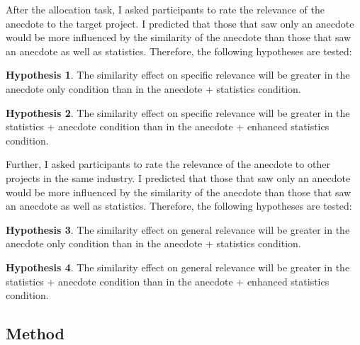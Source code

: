 \documentclass[a4paper, nobind, dvipsnames]{templates/ociamthesis}
\theoremstyle{definition}
\theoremstyle{definition}
\theoremstyle{definition}
\theoremstyle{definition}
\newtheorem{hypothesis}{Hypothesis}[chapter]
\theoremstyle{remark}
\begin{document}
After the allocation task, I asked participants to rate the relevance of the
anecdote to the target project. I predicted that those that saw only an
anecdote would be more influenced by the similarity of the anecdote than those
that saw an anecdote as well as statistics. Therefore, the following hypotheses
are tested:

\begin{hypothesis}
\protect\hypertarget{hyp:relevance-specific-anecdotes-1}{}{\label{hyp:relevance-specific-anecdotes-1} }The similarity effect on specific relevance will be greater in the anecdote only
condition than in the anecdote + statistics condition.
\end{hypothesis}

\begin{hypothesis}
\protect\hypertarget{hyp:relevance-specific-enhanced-anecdotes-1}{}{\label{hyp:relevance-specific-enhanced-anecdotes-1} }The similarity effect on specific relevance will be greater in the statistics +
anecdote condition than in the anecdote + enhanced statistics condition.
\end{hypothesis}

Further, I asked participants to rate the relevance of the anecdote to other
projects in the same industry. I predicted that those that saw only an anecdote
would be more influenced by the similarity of the anecdote than those that saw
an anecdote as well as statistics. Therefore, the following hypotheses are
tested:

\begin{hypothesis}
\protect\hypertarget{hyp:relevance-general-anecdotes-1}{}{\label{hyp:relevance-general-anecdotes-1} }The similarity effect on general relevance will be greater in the anecdote only
condition than in the anecdote + statistics condition.
\end{hypothesis}

\begin{hypothesis}
\protect\hypertarget{hyp:relevance-general-enhanced-anecdotes-1}{}{\label{hyp:relevance-general-enhanced-anecdotes-1} }The similarity effect on general relevance will be greater in the statistics +
anecdote condition than in the anecdote + enhanced statistics condition.
\end{hypothesis}

\hypertarget{method-anecdotes-1-appendix}{%
\subsection{Method}\label{method-anecdotes-1-appendix}}
\end{document}
